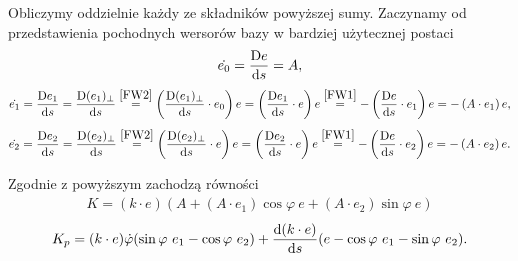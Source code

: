 Obliczymy oddzielnie każdy ze składników powyższej sumy.
Zaczynamy od przedstawienia pochodnych wersorów bazy w bardziej
użytecznej postaci 
\begin{align*}
\dot{e_0}= \frac{\text{D} e}{\text{d} s} = A,
\end{align*}
\begin{align*}
\dot{e_1}= \frac{\text{D} e_1 }{\text{d} s} = \frac{\text{D} (e_1)_\perp }{\text{d} s} 
\stackrel{\eqref{FW2}}{=} 
\left(\frac{\text{D} (e_1)_\perp }{\text{d} s}\cdot e_0\right)e 
= \left(\frac{\text{D} e_1 }{\text{d} s}\cdot e\right)e 
\stackrel{\eqref{FW1}}{=} 
 - \left(\frac{\text{D} e }{\text{d} s}\cdot e_1\right)e
= - \left(A\cdot e_1\right)e,
\end{align*}
\begin{align*}
\dot{e_2}= \frac{\text{D} e_2 }{\text{d} s} = \frac{\text{D} (e_2)_\perp }{\text{d} s} 
\stackrel{\eqref{FW2}}{=} 
\left(\frac{\text{D} (e_2)_\perp }{\text{d} s}\cdot e\right)e
= \left(\frac{\text{D} e_2 }{\text{d} s}\cdot e\right)e 
\stackrel{\eqref{FW1}}{=} 
 - \left(\frac{\text{D} e }{\text{d} s}\cdot e_2\right)e
= - \left(A\cdot e_2\right)e.
\end{align*}

Zgodnie z powyższym zachodzą równości
\begin{align*}
K= (k\cdot e) (A + \left(A\cdot e_1\right)\cos\varphi\ e+ 
\left(A\cdot e_2\right)\sin\varphi\ e )
\end{align*}
\begin{align*}
K_p= (k\cdot e) \dot{\varphi} ( \sin\varphi\ e_1 - \cos\varphi\ e_2  ) + 
\frac{\text{d}(k\cdot e)}{\text{d} s} (e-\cos\varphi\ e_1 - \sin\varphi\ e_2).
\end{align*}

